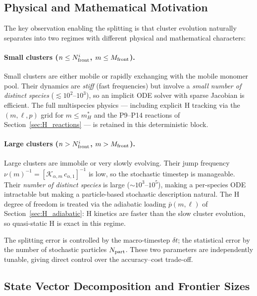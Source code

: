 \documentclass[pdflatex,sn-basic]{sn-jnl} %
\begin{document}
\subsection{Physical and Mathematical Motivation}
\label{sec:hybrid_motivation}

The key observation enabling the splitting is that cluster evolution
naturally separates into two regimes with different physical and
mathematical characters:

\paragraph{Small clusters ($n \leq N_{\rm front}^i$,
$m \leq M_{\rm front}$).}
Small clusters are either mobile or rapidly exchanging with the
mobile monomer pool.  Their dynamics are \emph{stiff} (fast
frequencies) but involve a \emph{small number of distinct species}
($\lesssim 10^2$--$10^3$), so an implicit ODE solver with sparse
Jacobian is efficient.  The full multispecies physics --- including
explicit H tracking via the $(m,\ell,p)$ grid for $m \leq m_H^*$
and the P9--P14 reactions of Section~\ref{sec:H_reactions} --- is
retained in this deterministic block.

\paragraph{Large clusters ($n > N_{\rm front}^i$,
$m > M_{\rm front}$).}
Large clusters are immobile or very slowly evolving.  Their jump
frequency $\nu(m)^{-1} = [\mathcal{K}_{\alpha,m}\,c_{\alpha,1}]^{-1}$
is low, so the stochastic timestep is manageable.  Their
\emph{number of distinct species} is large ($\sim 10^3$--$10^5$),
making a per-species ODE intractable but making a particle-based
stochastic description natural.  The H degree of freedom is treated
via the adiabatic loading $\bar{p}(m,\ell)$ of
Section~\ref{sec:H_adiabatic}: H kinetics are faster than the slow
cluster evolution, so quasi-static H is exact in this regime.

The splitting error is controlled by the macro-timestep $\delta t$;
the statistical error by the number of stochastic particles
$N_{\rm part}$.  These two parameters are independently tunable,
giving direct control over the accuracy--cost trade-off.

\subsection{State Vector Decomposition and Frontier Sizes}
\label{sec:hybrid_state}
\end{document}

